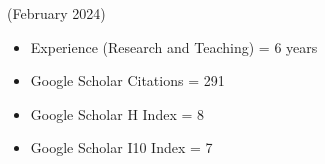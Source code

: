 

\begin{cvparagraph}
\textcolor{lighttext}{(February 2024)}
\begin{itemize}
\setlength{\itemsep}{-0.5em}
    \item \textcolor{russell}{Experience (Research and Teaching) = 6 years}
    \item \textcolor{russell}{Google Scholar Citations = 291}
    \item \textcolor{russell}{Google Scholar H Index = 8}
    \item \textcolor{russell}{Google Scholar I10 Index = 7}
\end{itemize}

\end{cvparagraph}